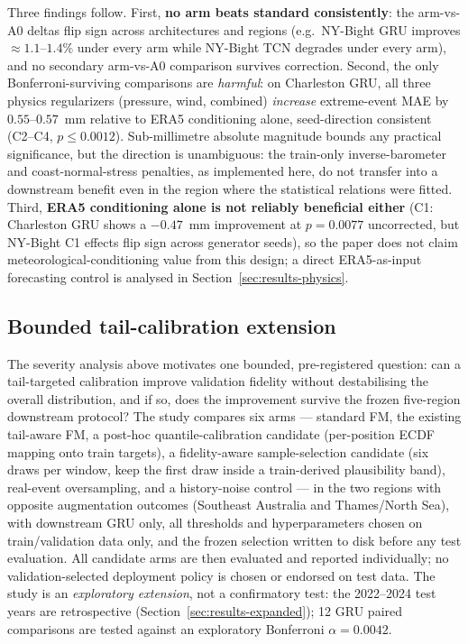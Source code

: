 Three findings follow. First, \textbf{no arm beats standard consistently}:
the arm-vs-A0 deltas flip sign across architectures and regions (e.g.\
NY-Bight GRU improves $\approx 1.1$--$1.4\%$ under every arm while NY-Bight
TCN degrades under every arm), and no secondary arm-vs-A0 comparison
survives correction. Second, the only Bonferroni-surviving comparisons are
\emph{harmful}: on Charleston GRU, all three physics regularizers
(pressure, wind, combined) \emph{increase} extreme-event MAE by
$0.55$--$0.57$~mm relative to ERA5 conditioning alone, seed-direction
consistent (C2--C4, $p \le 0.0012$). Sub-millimetre absolute magnitude
bounds any practical significance, but the direction is unambiguous: the
train-only inverse-barometer and coast-normal-stress penalties, as
implemented here, do not transfer into a downstream benefit even in the
region where the statistical relations were fitted. Third, \textbf{ERA5
conditioning alone is not reliably beneficial either} (C1: Charleston GRU
shows a $-0.47$~mm improvement at $p=0.0077$ uncorrected, but NY-Bight
C1 effects flip sign across generator seeds), so the paper does not claim
meteorological-conditioning value from this design; a direct
ERA5-as-input forecasting control is analysed in
Section~\ref{sec:results-physics}.

\subsection{Bounded tail-calibration extension}
\label{sec:results-tail-calibration}

The severity analysis above motivates one bounded, pre-registered question:
can a tail-targeted calibration improve validation fidelity without
destabilising the overall distribution, and if so, does the improvement
survive the frozen five-region downstream protocol? The study compares six
arms --- standard FM, the existing tail-aware FM, a post-hoc
quantile-calibration candidate (per-position ECDF mapping onto train
targets), a fidelity-aware sample-selection candidate (six draws per
window, keep the first draw inside a train-derived plausibility band),
real-event oversampling, and a history-noise control --- in the two regions
with opposite augmentation outcomes (Southeast Australia and Thames/North
Sea), with downstream GRU only, all thresholds and hyperparameters chosen on
train/validation data only, and the frozen selection written to disk before
any test evaluation. All candidate arms are then evaluated and reported
individually; no validation-selected deployment policy is chosen or endorsed
on test data. The study is an \emph{exploratory extension}, not a
confirmatory test: the 2022--2024 test years are retrospective
(Section~\ref{sec:results-expanded}); 12 GRU paired comparisons are tested
against an exploratory Bonferroni $\alpha=0.0042$.

